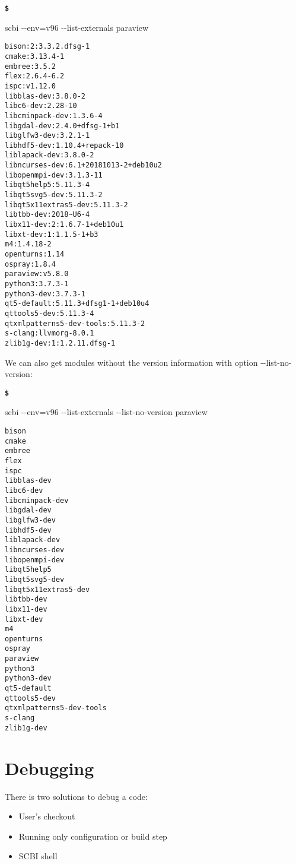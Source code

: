 \documentclass[a4paper,12pt,twoside]{article}
\newenvironment{shellcommand}{
	\begin{list}{ %
			\bfseries\texttt \$
		}{ %
			\ttfamily
			\setlength{\topsep}{-0.3ex}
			\setlength{\labelwidth}{1in}
			\setlength{\leftmargin}{0.7in}
			\setlength{\labelsep}{0.5ex}
			\setlength{\rightmargin}{0.5in}
			\setlength{\itemsep}{1ex}
			\setlength{\parsep}{0ex}
			\setlength{\listparindent}{0.5in}
		}
	}{
	\end{list}
}
\newcommand{\ddash}{-{}-}
\let\stdsection\section
\renewcommand\section{\newpage\stdsection}
\begin{document}
\begin{shellcommand}
	\item scbi \ddash{}env=v96 \ddash{}list-externals paraview
\end{shellcommand}

\begin{lstlisting}
bison:2:3.3.2.dfsg-1
cmake:3.13.4-1
embree:3.5.2
flex:2.6.4-6.2
ispc:v1.12.0
libblas-dev:3.8.0-2
libc6-dev:2.28-10
libcminpack-dev:1.3.6-4
libgdal-dev:2.4.0+dfsg-1+b1
libglfw3-dev:3.2.1-1
libhdf5-dev:1.10.4+repack-10
liblapack-dev:3.8.0-2
libncurses-dev:6.1+20181013-2+deb10u2
libopenmpi-dev:3.1.3-11
libqt5help5:5.11.3-4
libqt5svg5-dev:5.11.3-2
libqt5x11extras5-dev:5.11.3-2
libtbb-dev:2018~U6-4
libx11-dev:2:1.6.7-1+deb10u1
libxt-dev:1:1.1.5-1+b3
m4:1.4.18-2
openturns:1.14
ospray:1.8.4
paraview:v5.8.0
python3:3.7.3-1
python3-dev:3.7.3-1
qt5-default:5.11.3+dfsg1-1+deb10u4
qttools5-dev:5.11.3-4
qtxmlpatterns5-dev-tools:5.11.3-2
s-clang:llvmorg-8.0.1
zlib1g-dev:1:1.2.11.dfsg-1
\end{lstlisting}

We can also get modules without the version information with option \ddash{}list-no-version:

\begin{shellcommand}
	\item scbi \ddash{}env=v96 \ddash{}list-externals \ddash{}list-no-version paraview
\end{shellcommand}

\begin{lstlisting}
bison
cmake
embree
flex
ispc
libblas-dev
libc6-dev
libcminpack-dev
libgdal-dev
libglfw3-dev
libhdf5-dev
liblapack-dev
libncurses-dev
libopenmpi-dev
libqt5help5
libqt5svg5-dev
libqt5x11extras5-dev
libtbb-dev
libx11-dev
libxt-dev
m4
openturns
ospray
paraview
python3
python3-dev
qt5-default
qttools5-dev
qtxmlpatterns5-dev-tools
s-clang
zlib1g-dev
\end{lstlisting}


\section{Debugging}
\label{debugging}

There is two solutions to debug a code:

\begin{itemize}
	\item User's checkout
	\item Running only configuration or build step
	\item SCBI shell
\end{itemize}
\end{document}
